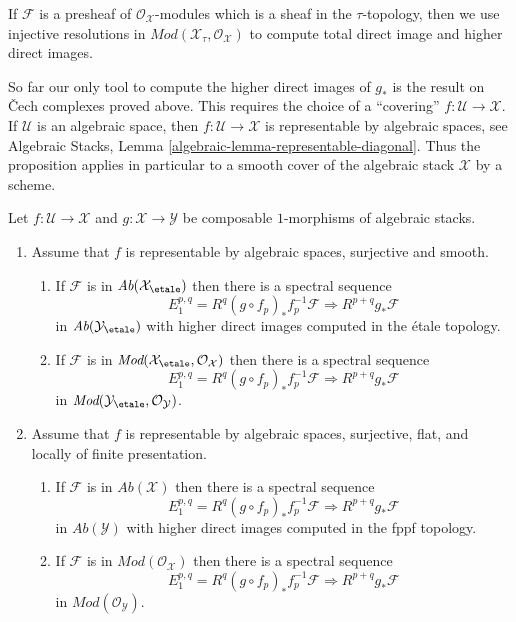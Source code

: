 \medskip\noindent
If $\mathcal{F}$ is a presheaf of $\mathcal{O}_\mathcal{X}$-modules
which is a sheaf in the $\tau$-topology, then we use injective
resolutions in $\textit{Mod}(\mathcal{X}_\tau, \mathcal{O}_\mathcal{X})$
to compute total direct image and higher direct images.

\medskip\noindent
So far our only tool to compute the higher direct images of $g_*$
is the result on {\v C}ech complexes proved above. This requires the choice
of a ``covering'' $f : \mathcal{U} \to \mathcal{X}$. If $\mathcal{U}$
is an algebraic space, then $f : \mathcal{U} \to \mathcal{X}$
is representable by algebraic spaces, see
Algebraic Stacks, Lemma \ref{algebraic-lemma-representable-diagonal}.
Thus the proposition applies in particular to a smooth cover of the
algebraic stack $\mathcal{X}$ by a scheme.

\begin{proposition}
\label{proposition-smooth-covering-compute-direct-image}
Let $f : \mathcal{U} \to \mathcal{X}$ and $g : \mathcal{X} \to \mathcal{Y}$
be composable $1$-morphisms of algebraic stacks.
\begin{enumerate}
\item Assume that $f$ is representable by algebraic spaces, surjective and
smooth.
\begin{enumerate}
\item If $\mathcal{F}$ is in $\textit{Ab}(\mathcal{X}_\etale)$
then there is a spectral sequence
$$
E_1^{p, q} = R^q(g \circ f_p)_*f_p^{-1}\mathcal{F}
\Rightarrow
R^{p + q}g_*\mathcal{F}
$$
in $\textit{Ab}(\mathcal{Y}_\etale)$ with higher direct images
computed in the \'etale topology.
\item If $\mathcal{F}$ is in
$\textit{Mod}(\mathcal{X}_\etale, \mathcal{O}_\mathcal{X})$ then
there is a spectral sequence
$$
E_1^{p, q} = R^q(g \circ f_p)_*f_p^{-1}\mathcal{F}
\Rightarrow
R^{p + q}g_*\mathcal{F}
$$
in $\textit{Mod}(\mathcal{Y}_\etale, \mathcal{O}_\mathcal{Y})$.
\end{enumerate}
\item Assume that $f$ is representable by algebraic spaces, surjective,
flat, and locally of finite presentation.
\begin{enumerate}
\item If $\mathcal{F}$ is in $\textit{Ab}(\mathcal{X})$ then there is
a spectral sequence
$$
E_1^{p, q} = R^q(g \circ f_p)_*f_p^{-1}\mathcal{F}
\Rightarrow
R^{p + q}g_*\mathcal{F}
$$
in $\textit{Ab}(\mathcal{Y})$ with higher direct images
computed in the fppf topology.
\item If $\mathcal{F}$ is in $\textit{Mod}(\mathcal{O}_\mathcal{X})$ then
there is a spectral sequence
$$
E_1^{p, q} = R^q(g \circ f_p)_*f_p^{-1}\mathcal{F}
\Rightarrow
R^{p + q}g_*\mathcal{F}
$$
in $\textit{Mod}(\mathcal{O}_\mathcal{Y})$.
\end{enumerate}
\end{enumerate}
\end{proposition}

